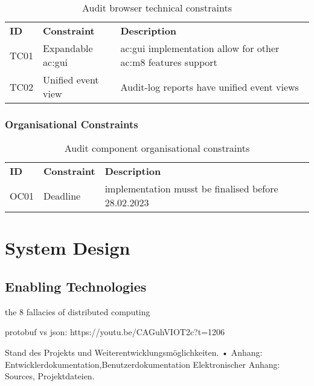 \begin{table}[H]
  \begin{center}
    \caption{Audit browser technical constraints}
    \label{tab:abtc}
    \def\arraystretch{1.5}
    \begin{tabularx}{\linewidth}{|l l X |}
      \hline
      \rowcolor{gray!20}
      \textbf{ID} & \textbf{Constraint} & \textbf{Description}\\
      TC01 & Expandable \gls{ac:gui} & \gls{ac:gui} implementation allow for other \gls{ac:m8} features support\\
      TC02 & Unified event view & Audit-log reports have unified event views\\
      \hline
    \end{tabularx}
  \end{center}
\end{table}

\subsubsection{Organisational Constraints}

\begin{table}[H]
  \begin{center}
    \caption{Audit component organisational constraints}
    \label{tab:acoc}
    \def\arraystretch{1.5}
    \begin{tabularx}{\linewidth}{|l l X |}
      \hline
      \rowcolor{gray!20}
      \textbf{ID} & \textbf{Constraint} & \textbf{Description}\\
      OC01 & Deadline & implementation musst be finalised before 28.02.2023\\
      \hline
    \end{tabularx}
  \end{center}
\end{table}

\section{System Design}

\subsection{Enabling Technologies}

the 8 fallacies of distributed computing

protobuf vs json: https://youtu.be/CAGuhVIOT2c?t=1206

Stand des Projekts und Weiterentwicklungsmöglichkeiten.
• Anhang: Entwicklerdokumentation,Benutzerdokumentation
Elektronischer Anhang: Sources, Projektdateien.

